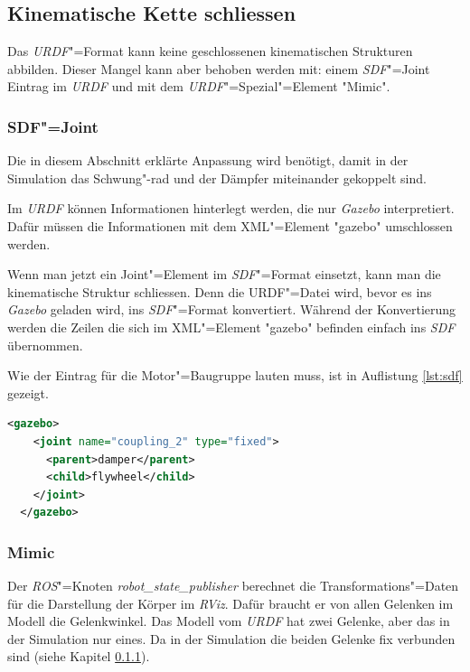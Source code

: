 
\subsection{Kinematische Kette schliessen}
\label{chap:kin-schliessen}
Das \textit{URDF}"=Format kann keine geschlossenen kinematischen Strukturen abbilden.
Dieser Mangel kann aber behoben werden mit: einem \textit{SDF}"=Joint Eintrag im \textit{URDF} und mit dem \textit{URDF}"=Spezial"=Element \textsc{"}Mimic\textsc{"}.

\subsubsection{SDF"=Joint}
\label{chap:sdf-joint}
Die in diesem Abschnitt erklärte Anpassung wird benötigt, damit in der Simulation das Schwung"-rad und der Dämpfer miteinander gekoppelt sind.

Im \textit{URDF} können Informationen hinterlegt werden, die nur \textit{Gazebo} interpretiert.
Dafür müssen die Informationen mit dem XML"=Element \textsc{"}gazebo\textsc{"} umschlossen werden.

Wenn man jetzt ein Joint"=Element im \textit{SDF}"=Format einsetzt, kann man die kinematische Struktur schliessen.
Denn die {URDF}"=Datei wird, bevor es ins \textit{Gazebo} geladen wird, ins \textit{SDF}"=Format konvertiert.
Während der Konvertierung werden die Zeilen die sich im XML"=Element \textsc{"}gazebo\textsc{"} befinden einfach ins \textit{SDF} übernommen.

Wie der Eintrag für die Motor"=Baugruppe lauten muss, ist in Auflistung \ref{lst:sdf} gezeigt.
\begin{lstlisting}[language=xml, captionpos=b, caption=SDF-Joint in URDF, label={lst:sdf}]
  <gazebo>
    <joint name="coupling_2" type="fixed">
      <parent>damper</parent>
      <child>flywheel</child>
    </joint>
  </gazebo>
\end{lstlisting}
\subsubsection{Mimic}
\label{chap:mimic}
Der \textit{ROS}"=Knoten \textit{robot\_state\_publisher} berechnet die Transformations"=Daten für die Darstellung der Körper im \textit{RViz}.
Dafür braucht er von allen Gelenken im Modell die Gelenkwinkel.
Das Modell vom \textit{URDF} hat zwei Gelenke, aber das in der Simulation nur eines.
Da in der Simulation die beiden Gelenke fix verbunden sind (siehe Kapitel \ref{chap:sdf-joint}).

